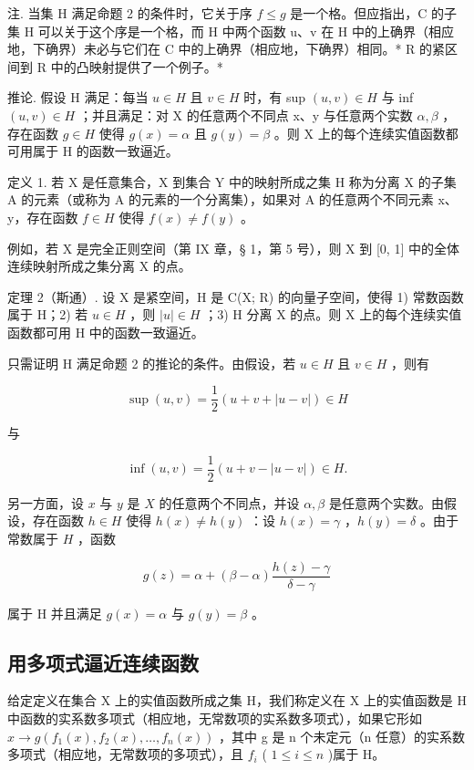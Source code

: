 注. 当集 H 满足命题 2 的条件时，它关于序 \(f \leqslant g\) 是一个格。但应指出，C 的子集 H 可以关于这个序是一个格，而 H 中两个函数 u、v 在 H 中的上确界（相应地，下确界）未必与它们在 C 中的上确界（相应地，下确界）相同。* R 的紧区间到 R 中的凸映射提供了一个例子。*

推论. 假设 H 满足：每当 \(u \in H\) 且 \(v \in H\) 时，有 sup \((u, v) \in H\) 与 inf \((u, v) \in H\) ；并且满足：对 X 的任意两个不同点 x、y 与任意两个实数 \(\alpha, \beta\) ，存在函数 \(g \in H\) 使得 \(g(x) = \alpha\) 且 \(g(y) = \beta\) 。则 X 上的每个连续实值函数都可用属于 H 的函数一致逼近。

定义 1. 若 X 是任意集合，X 到集合 Y 中的映射所成之集 H 称为分离 X 的子集 A 的元素（或称为 A 的元素的一个分离集），如果对 A 的任意两个不同元素 x、y，存在函数 \(f \in H\) 使得 \(f(x) \neq f(y)\) 。

例如，若 X 是完全正则空间（第 IX 章，§ 1，第 5 号），则 X 到 {[}0, 1{]} 中的全体连续映射所成之集分离 X 的点。

定理 2（斯通）. 设 X 是紧空间，H 是 C(X; R) 的向量子空间，使得 1) 常数函数属于 H；2) 若 \(u \in H\) ，则 \(|u| \in H\) ；3) H 分离 X 的点。则 X 上的每个连续实值函数都可用 H 中的函数一致逼近。

只需证明 H 满足命题 2 的推论的条件。由假设，若 \(u \in H\) 且 \(v \in H\) ，则有

\[
\sup (u, v) = \frac {1}{2} (u + v + | u - v |) \in H
\]

与

\[
\inf (u, v) = \frac {1}{2} (u + v - | u - v |) \in H.
\]

另一方面，设 \(x\) 与 \(y\) 是 \(X\) 的任意两个不同点，并设 \(\alpha, \beta\) 是任意两个实数。由假设，存在函数 \(h \in H\) 使得 \(h(x) \neq h(y)\) ：设 \(h(x) = \gamma\) ，\(h(y) = \delta\) 。由于常数属于 \(H\) ，函数

\[
g (z) = \alpha + (\beta - \alpha) \frac {h (z) - \gamma}{\delta - \gamma}
\]

属于 H 并且满足 \(g(x) = \alpha\) 与 \(g(y) = \beta\) 。

\subsection{用多项式逼近连续函数}

给定定义在集合 X 上的实值函数所成之集 H，我们称定义在 X 上的实值函数是 H 中函数的实系数多项式（相应地，无常数项的实系数多项式），如果它形如 \(x \to g(f_{1}(x), f_{2}(x), \ldots, f_{n}(x))\) ，其中 g 是 n 个未定元（n 任意）的实系数多项式（相应地，无常数项的多项式），且 \(f_{i}\) ( \(1 \leqslant i \leqslant n\) )属于 H。

